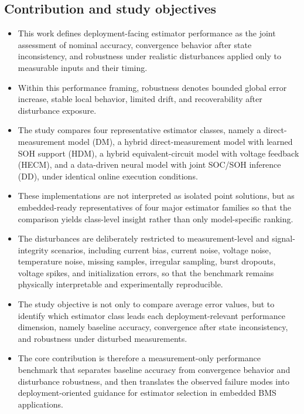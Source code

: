 \documentclass[review,nopreprintline]{elsarticle}
\begin{document}
\subsection{Contribution and study objectives}
\begin{itemize}[leftmargin=*]
    \item This work defines deployment-facing estimator performance as the joint assessment of nominal accuracy, convergence behavior after state inconsistency, and robustness under realistic disturbances applied only to measurable inputs and their timing.
    \item Within this performance framing, robustness denotes bounded global error increase, stable local behavior, limited drift, and recoverability after disturbance exposure.
    \item The study compares four representative estimator classes, namely a direct-measurement model (DM), a hybrid direct-measurement model with learned SOH support (HDM), a hybrid equivalent-circuit model with voltage feedback (HECM), and a data-driven neural model with joint SOC/SOH inference (DD), under identical online execution conditions.
    \item These implementations are not interpreted as isolated point solutions, but as embedded-ready representatives of four major estimator families so that the comparison yields class-level insight rather than only model-specific ranking.
    \item The disturbances are deliberately restricted to measurement-level and signal-integrity scenarios, including current bias, current noise, voltage noise, temperature noise, missing samples, irregular sampling, burst dropouts, voltage spikes, and initialization errors, so that the benchmark remains physically interpretable and experimentally reproducible.
    \item The study objective is not only to compare average error values, but to identify which estimator class leads each deployment-relevant performance dimension, namely baseline accuracy, convergence after state inconsistency, and robustness under disturbed measurements.
    \item The core contribution is therefore a measurement-only performance benchmark that separates baseline accuracy from convergence behavior and disturbance robustness, and then translates the observed failure modes into deployment-oriented guidance for estimator selection in embedded BMS applications.
\end{itemize}
\end{document}
